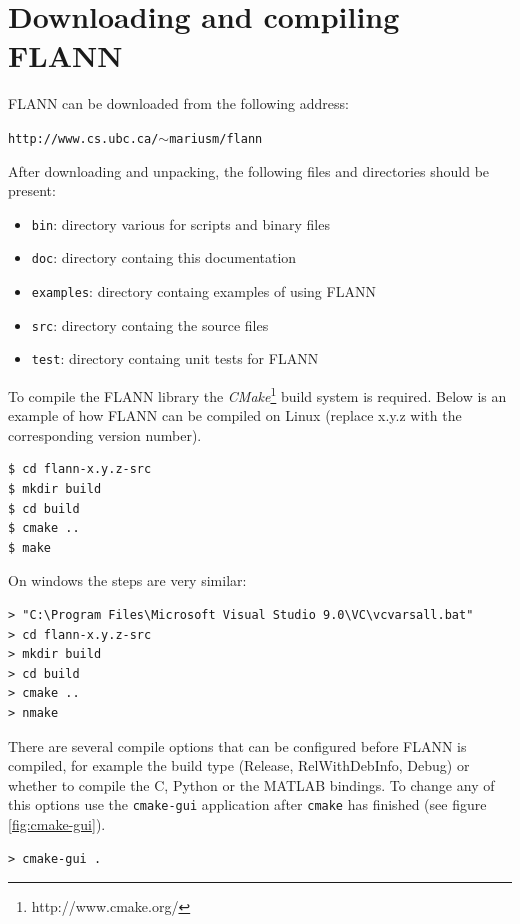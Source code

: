 \documentclass[letter,10pt]{article}
\begin{document}
\section{Downloading and compiling FLANN}

FLANN can be downloaded from the following address:
\begin{center}
\texttt{http://www.cs.ubc.ca/$\sim$mariusm/flann}
\end{center}

After downloading and unpacking, the following files and directories should
be present:
\begin{itemize}
\item \texttt{bin}: directory various for scripts and binary files
\item \texttt{doc}: directory containg this documentation
\item \texttt{examples}: directory containg examples of using FLANN
\item \texttt{src}: directory containg the source files
\item \texttt{test}: directory containg unit tests for FLANN
\end{itemize}



To compile the FLANN library the \textit{CMake}\footnote{http://www.cmake.org/} build system is required.
Below is an example of how FLANN can be compiled on Linux (replace x.y.z with the corresponding version number).
\begin{Verbatim}[fontsize=\scriptsize,frame=single]
$ cd flann-x.y.z-src
$ mkdir build
$ cd build
$ cmake ..
$ make
\end{Verbatim}

On windows the steps are very similar:
 
\begin{Verbatim}[fontsize=\scriptsize,frame=single]
> "C:\Program Files\Microsoft Visual Studio 9.0\VC\vcvarsall.bat"
> cd flann-x.y.z-src
> mkdir build
> cd build
> cmake ..
> nmake
\end{Verbatim}

There are several compile options that can be configured before FLANN is compiled, for example the build type 
(Release, RelWithDebInfo, Debug) or whether to compile the C, Python or the MATLAB bindings. To change any of this
options use the \texttt{cmake-gui} application after \texttt{cmake} has finished (see figure \ref{fig:cmake-gui}).
\begin{Verbatim}[fontsize=\scriptsize,frame=single]
> cmake-gui .
\end{Verbatim}
\end{document}
